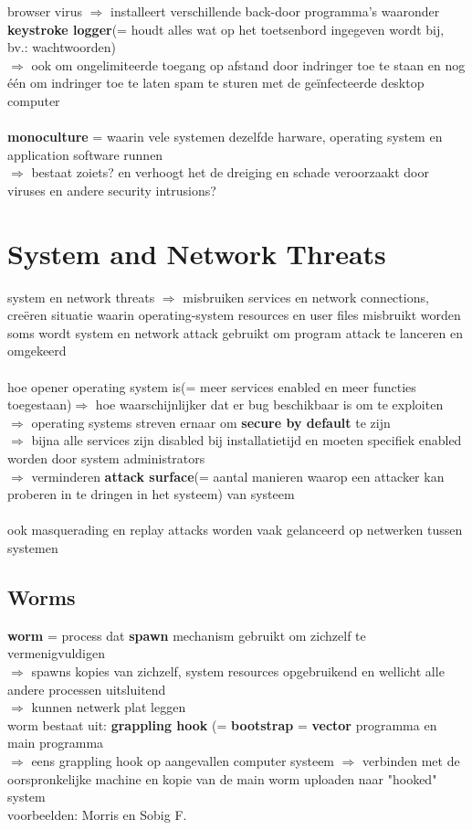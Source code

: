 \documentclass{report}
\begin{document}
browser virus $\Rightarrow$ installeert verschillende back-door programma's waaronder \textbf{keystroke logger}(= houdt alles wat op het toetsenbord ingegeven wordt bij, bv.: wachtwoorden)
\\$\Rightarrow$ ook om ongelimiteerde toegang op afstand door indringer toe te staan en nog \'e\'en om indringer toe te laten spam te sturen met de geïnfecteerde desktop computer
\\
\\\textbf{monoculture} = waarin vele systemen dezelfde harware, operating system en application software runnen
\\$\Rightarrow$ bestaat zoiets? en verhoogt het de dreiging en schade veroorzaakt door viruses en andere security intrusions?

\section{System and Network Threats}
system en network threats $\Rightarrow$ misbruiken services en network connections, cre\"eren situatie waarin operating-system resources en user files misbruikt worden
\\soms wordt system en network attack gebruikt om program attack te lanceren en omgekeerd
\\
\\hoe opener operating system is(= meer services enabled en meer functies toegestaan)$\Rightarrow$ hoe waarschijnlijker dat er bug beschikbaar is om te exploiten
\\$\Rightarrow$ operating systems streven ernaar om \textbf{secure by default} te zijn
\\$\Rightarrow$ bijna alle services zijn disabled bij installatietijd en moeten specifiek enabled worden door system administrators
\\$\Rightarrow$ verminderen \textbf{attack surface}(= aantal manieren waarop een attacker kan proberen in te dringen in het systeem) van systeem
\\
\\ook masquerading en replay attacks worden vaak gelanceerd op netwerken tussen systemen

\subsection{Worms}
\textbf{worm} = process dat \textbf{spawn} mechanism gebruikt om zichzelf te vermenigvuldigen
\\$\Rightarrow$ spawns kopies van zichzelf, system resources opgebruikend en wellicht alle andere processen uitsluitend
\\$\Rightarrow$ kunnen netwerk plat leggen
\\worm bestaat uit: \textbf{grappling hook} (= \textbf{bootstrap} = \textbf{vector} programma en main programma
\\$\Rightarrow$ eens grappling hook op aangevallen computer systeem $\Rightarrow$ verbinden met de oorspronkelijke machine en kopie van de main worm uploaden naar "hooked" system
\\voorbeelden: Morris en Sobig F.
\end{document}
